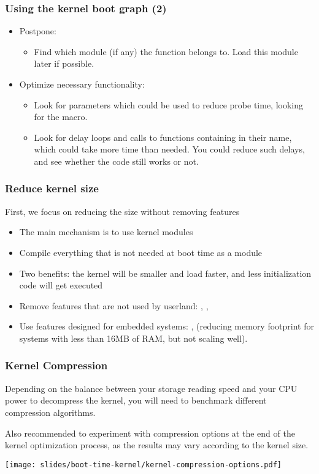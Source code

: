 \begin{frame}
\frametitle{Using the kernel boot graph (2)}
\begin{itemize}
\item Postpone:
      \begin{itemize}
      \item Find which module (if any) the function belongs to.
            Load this module later if possible.
      \end{itemize}
\item Optimize necessary functionality:
      \begin{itemize}
      \item Look for parameters which could be used to reduce probe time,
            looking for the  macro.
      \item Look for delay loops and calls to functions containing
             in their name, which could take more time than
            needed. You could reduce such delays, and see whether the
            code still works or not.
      \end{itemize}
\end{itemize}
\end{frame}

\begin{frame}
\frametitle{Reduce kernel size}
First, we focus on reducing the size without removing features
\begin{itemize}
	\item The main mechanism is to use kernel modules
	\item Compile everything that is not needed at boot time as a
		module
	\item Two benefits: the kernel will be smaller and load faster, and
		less initialization code will get executed
	\item Remove features that are not used by userland:
		, ,
	\item Use features designed for embedded systems:
	      , 
	      (reducing memory footprint for systems with less than 16MB
	      of RAM, but not scaling well).
\end{itemize}
\end{frame}

\begin{frame}
\frametitle{Kernel Compression}
Depending on the balance between your storage reading speed and your
CPU power to decompress the kernel, you will need to benchmark
different compression algorithms.

Also recommended to experiment with compression options at the
end of the kernel optimization process, as the results may vary
according to the kernel size.
\begin{center}
    \texttt{[image: slides/boot-time-kernel/kernel-compression-options.pdf]}
\end{center}
\end{frame}

